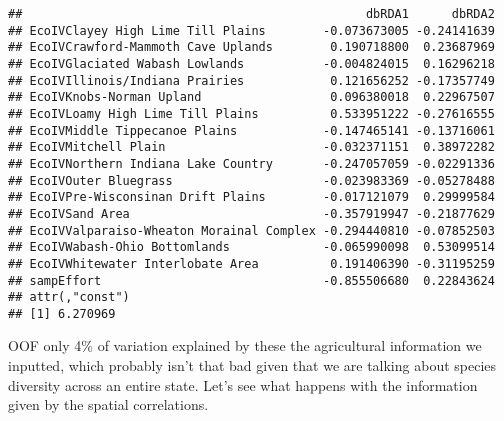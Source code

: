 \documentclass[
]{article}
\newenvironment{Shaded}{\begin{snugshade}}{\end{snugshade}}
\newcommand{\DataTypeTok}[1]{\textcolor[rgb]{0.13,0.29,0.53}{#1}}
\newcommand{\DecValTok}[1]{\textcolor[rgb]{0.00,0.00,0.81}{#1}}
\newcommand{\KeywordTok}[1]{\textcolor[rgb]{0.13,0.29,0.53}{\textbf{#1}}}
\newcommand{\NormalTok}[1]{#1}
\newcommand{\OperatorTok}[1]{\textcolor[rgb]{0.81,0.36,0.00}{\textbf{#1}}}
\newcommand{\OtherTok}[1]{\textcolor[rgb]{0.56,0.35,0.01}{#1}}
\newcommand{\StringTok}[1]{\textcolor[rgb]{0.31,0.60,0.02}{#1}}
\begin{document}
\begin{verbatim}
##                                                dbRDA1      dbRDA2
## EcoIVClayey High Lime Till Plains        -0.073673005 -0.24141639
## EcoIVCrawford-Mammoth Cave Uplands        0.190718800  0.23687969
## EcoIVGlaciated Wabash Lowlands           -0.004824015  0.16296218
## EcoIVIllinois/Indiana Prairies            0.121656252 -0.17357749
## EcoIVKnobs-Norman Upland                  0.096380018  0.22967507
## EcoIVLoamy High Lime Till Plains          0.533951222 -0.27616555
## EcoIVMiddle Tippecanoe Plains            -0.147465141 -0.13716061
## EcoIVMitchell Plain                      -0.032371151  0.38972282
## EcoIVNorthern Indiana Lake Country       -0.247057059 -0.02291336
## EcoIVOuter Bluegrass                     -0.023983369 -0.05278488
## EcoIVPre-Wisconsinan Drift Plains        -0.017121079  0.29999584
## EcoIVSand Area                           -0.357919947 -0.21877629
## EcoIVValparaiso-Wheaton Morainal Complex -0.294440810 -0.07852503
## EcoIVWabash-Ohio Bottomlands             -0.065990098  0.53099514
## EcoIVWhitewater Interlobate Area          0.191406390 -0.31195259
## sampEffort                               -0.855506680  0.22843624
## attr(,"const")
## [1] 6.270969
\end{verbatim}

OOF only 4\% of variation explained by these the agricultural
information we inputted, which probably isn't that bad given that we are
talking about species diversity across an entire state. Let's see what
happens with the information given by the spatial correlations.

\begin{Shaded}
\end{Shaded}
\end{document}
